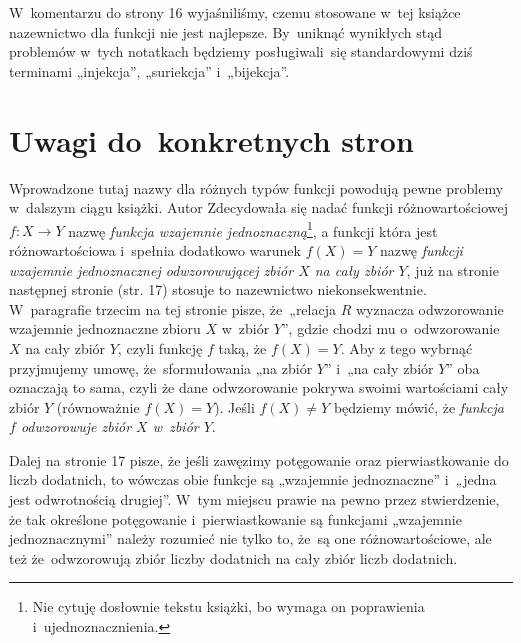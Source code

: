 \documentclass[a4paper,11pt]{article}
\numberwithin{equation}{section}
\begin{document}
\VerSpaceSix





\noindent
W~komentarzu do strony 16 wyjaśniliśmy, czemu stosowane w~tej książce
nazewnictwo dla funkcji nie jest najlepsze. By~uniknąć wynikłych stąd
problemów w~tych notatkach będziemy posługiwali~się standardowymi dziś
terminami „injekcja”, „suriekcja” i~„bijekcja”.

\VerSpaceTwo





\section{Uwagi do~konkretnych stron}

\label{sec:Grzegorczyk-Zarys-ETC-Uwagi-do-konkretnych-stron}


\noindent
{} Wprowadzone tutaj nazwy dla różnych typów funkcji powodują pewne
problemy w~dalszym ciągu książki. Autor Zdecydowała się nadać funkcji
różnowartościowej $f : X \to Y$ nazwę \textit{funkcja wzajemnie
  jednoznaczną}\footnote{Nie cytuję dosłownie tekstu książki,
  bo wymaga on poprawienia i~ujednoznacznienia.}, a funkcji która
jest różnowartościowa i~spełnia dodatkowo warunek $f( X ) = Y$ nazwę
\textit{funkcji wzajemnie jednoznacznej odwzorowującej zbiór $X$ na cały
  zbiór $Y$}, już na stronie następnej stronie (str. 17) stosuje to
nazewnictwo niekonsekwentnie. W~paragrafie trzecim na tej stronie pisze,
że~„relacja $R$ wyznacza odwzorowanie wzajemnie jednoznaczne zbioru $X$
w~zbiór $Y$”, gdzie chodzi mu o~odwzorowanie $X$ na cały zbiór $Y$, czyli
funkcję $f$ taką, że
$f( X ) = Y$. Aby z tego wybrnąć przyjmujemy umowę, że~sformułowania
„na zbiór $Y$” i~„na cały zbiór $Y$” oba oznaczają to sama, czyli że
dane odwzorowanie pokrywa swoimi wartościami cały zbiór $Y$
(równoważnie $f( X ) = Y$). Jeśli $f( X ) \neq Y$ będziemy mówić, że
\textit{funkcja $f$ odwzorowuje zbiór $X$ w~zbiór $Y$}.

Dalej na stronie 17 pisze, że jeśli zawęzimy potęgowanie oraz
pierwiastkowanie do liczb dodatnich, to wówczas obie funkcje są
„wzajemnie jednoznaczne” i~„jedna jest odwrotnością drugiej”. W~tym
miejscu prawie na pewno przez stwierdzenie, że tak określone
potęgowanie i~pierwiastkowanie są funkcjami „wzajemnie jednoznacznymi”
należy rozumieć nie tylko to, że~są one różnowartościowe, ale też
że~odwzorowują zbiór liczby dodatnich na cały zbiór liczb dodatnich.
\end{document}
